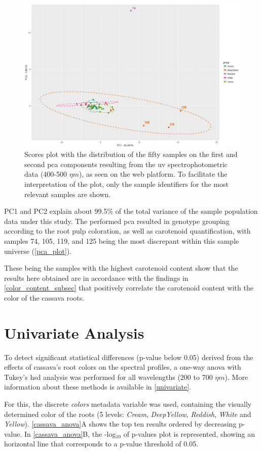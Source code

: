 \begin{figure}[h]
	\centering
	\includegraphics[width=0.7\linewidth]{Imagens/Case_study/pca_plot_3}
	\caption{Scores plot with the distribution of the fifty samples on the first and second \gls{pca} components resulting from the \gls{uv} spectrophotometric data (400-500 $\eta m$), as seen on the web platform. To facilitate the interpretation of the plot, only the sample identifiers for the most relevant samples are shown.}
	\label{pca_plot}
\end{figure}


PC1 and PC2 explain about 99.5\% of the total variance of the sample population data under this study. The performed \gls{pca} resulted in genotype grouping according to the root pulp coloration, as well as carotenoid quantification, with samples 74, 105, 119, and 125 being the most discrepant within this sample universe (\autoref{pca_plot}). 

These being the samples with the highest carotenoid content show that the results here obtained are in accordance with the findings in \autoref{color_content_subsec} that positively correlate the carotenoid content with the color of the cassava roots.


\section{Univariate Analysis} \label{univ_analysis}

To detect significant statistical differences (p-value below 0.05) derived from the effects of cassava's root colors on the spectral profiles, a one-way \gls{anova} with Tukey's \gls{hsd} analysis was performed for all wavelengths (200 to 700 $\eta m$). More information about these methods is available in \autoref{univariate}.

For this, the discrete \textit{colors} metadata variable was used, containing the visually determined color of the roots (5 levels:  \textit{Cream}, \textit{DeepYellow}, \textit{Reddish}, \textit{White} and \textit{Yellow}). \autoref{cassava_anova}A shows the top ten results ordered by decreasing p-value. In \autoref{cassava_anova}B,  the -log$_{10}$ of p-values plot is represented, showing an horizontal line that corresponds to a p-value threshold of 0.05. 


